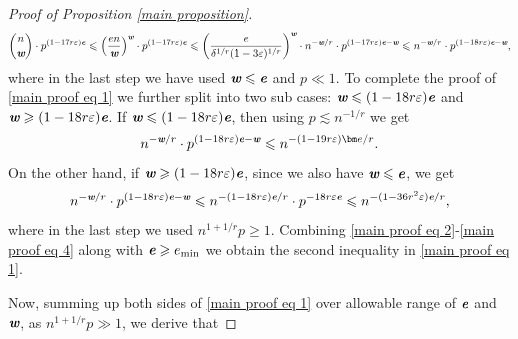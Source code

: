 \documentclass[a4paper,11pt,english,reqno]{amsart}
\numberwithin{equation}{section}
\renewcommand{\leq}{\leqslant}
\renewcommand{\geq}{\geqslant}
\newcommand{\W}{\mathcal{W}}
\renewcommand{\P}{\mathbb{P}}
\newcommand{\G}{\mathbb{G}}
\newcommand{\tu}[1]{\textup{#1}}
\def\mathbi#1{\textbf{\em #1}}
\begin{document}
\begin{proof}[Proof of Proposition \ref{main proposition}]
\begin{equation*}
				{n\choose \mathbi{w}} \cdot p^{(1-17r\varepsilon)\mathbi{e}} \leq \left(\frac{en}{\mathbi{w}}\right)^{\mathbi{w}} \cdot p^{(1-17r\varepsilon)\mathbi{e}}\leq \left(\frac{e}{\delta^{1/r}(1-3\varepsilon)^{1/r}}\right)^{\mathbi{w}}\cdot n^{-\mathbi{w}/r}\cdot p^{(1-17r\varepsilon)\mathbi{e}-\mathbi{w}}\leq n^{-\mathbi{w}/r} \cdot p^{(1-18r\varepsilon)\mathbi{e}-\mathbi{w}},
			\end{equation*}
			where in the last step we have used $\mathbi{w}\leq \mathbi{e}$ and $p\ll1$. 
			To complete the proof of \eqref{main proof eq 1} we further split into two sub cases: $\mathbi{w}\leq (1-18r\varepsilon)\mathbi{e}$ and $\mathbi{w}\geq (1-18r\varepsilon)\mathbi{e}$. If $\mathbi{w}\leq (1-18r\varepsilon)\mathbi{e}$, then using $p\lesssim n^{-1/r}$ we get
			\begin{equation}
				\label{main proof eq 3}
				n^{-\mathbi{w}/r}\cdot p^{(1-18r\varepsilon)\mathbi{e}-\mathbi{w}}\leq n^{-(1-19r\varepsilon){\bm e}/r} .
			\end{equation}
			On the other hand, if $\mathbi{w}\geq (1-18r\varepsilon)\mathbi{e}$, since we also have $\mathbi{w}\leq \mathbi{e}$, we get
			\begin{equation}
				\label{main proof eq 4}
				n^{-\mathbi{w}/r}\cdot p^{(1-18r\varepsilon)\mathbi{e}-\mathbi{w}}\leq n^{-(1-18r\varepsilon)\mathbi{e}/r}\cdot p^{-18 r\varepsilon \mathbi{e}}\leq n^{-(1-36r^{2}\varepsilon)\mathbi{e}/r},
			\end{equation}
			where in the last step we used $n^{1+1/r}p\geq 1$. 
			Combining \eqref{main proof eq 2}-\eqref{main proof eq 4} along with $\mathbi{e}\geq e_{\min}$  we obtain the second inequality in \eqref{main proof eq 1}.
			
			
			Now, summing up both sides of \eqref{main proof eq 1} over allowable range of $\mathbi{e}$ and $\mathbi{w}$, as $n^{1+1/r} p \gg 1$, we derive that
			

\end{proof}
\end{document}
